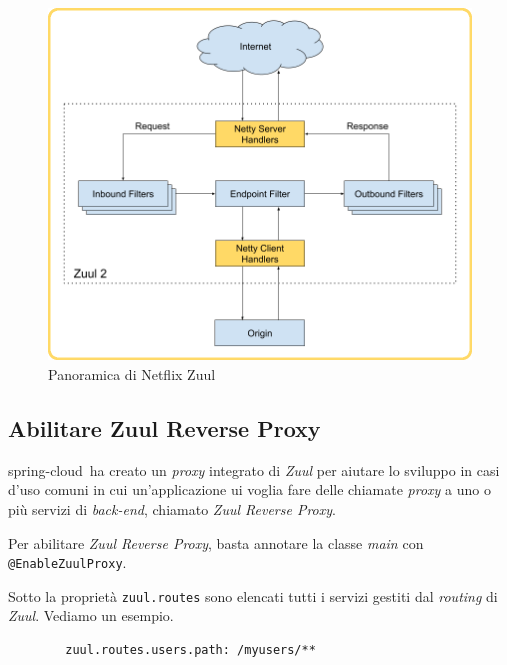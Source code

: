 \begin{figure}[H]
	\centering
	\includegraphics[width=\textwidth]{immagini/zuul.png}
	\caption[Panoramica di Netflix Zuul]{Panoramica di Netflix Zuul\footnotemark}
	\label{netflix-zuul}
\end{figure}

\subsection{Abilitare Zuul Reverse Proxy} \gls{spring-cloud}\gloss\ ha creato un \textit{proxy} integrato di \textit{Zuul} per aiutare lo sviluppo in casi d'uso comuni in cui un'applicazione \gls{ui} voglia fare delle chiamate \textit{proxy} a uno o più servizi di \textit{back-end}, chiamato \textit{Zuul Reverse Proxy}.

Per abilitare \textit{Zuul Reverse Proxy}, basta annotare la classe \textit{main} con \texttt{@EnableZuulProxy}.

Sotto la proprietà \texttt{zuul.routes} sono elencati tutti i servizi gestiti dal \textit{routing} di \textit{Zuul}.
Vediamo un esempio.

\begin{tcolorbox}
	\begin{verbatim}
		zuul.routes.users.path: /myusers/**
	\end{verbatim}
\end{tcolorbox}

